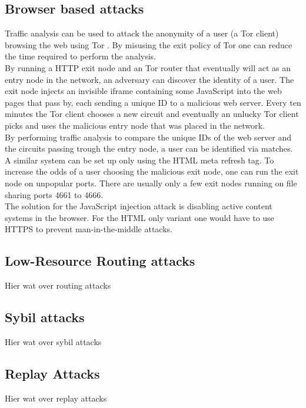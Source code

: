 \documentclass[journal]{IEEEtran}
\begin{document}
		\subsection{Browser based attacks}
		Traffic analysis can be used to attack the anonymity of a user (a Tor client) browsing the web using Tor \cite{abbott2007browser}. By misusing the exit policy of Tor one can reduce the time required to perform the analysis.\\

		By running a HTTP exit node and an Tor router that eventually will act as an entry node in the network, an adversary can discover the identity of a user. The exit node injects an invisible iframe containing some JavaScript into the web pages that pass by, each sending a unique ID to a malicious web server. Every ten minutes the Tor client chooses a new circuit and eventually an unlucky Tor client picks and uses the malicious entry node that was placed in the network.\\

		By performing traffic analysis to compare the unique IDs of the web server and the circuits passing trough the entry node, a user can be identified via matches. A similar system can be set up only using the HTML meta refresh tag. To increase the odds of a user choosing the malicious exit node, one can run the exit node on unpopular ports. There are usually only a few exit nodes running on file sharing ports 4661 to 4666.\\

		The solution for the JavaScript injection attack is disabling active content systems in the browser. For the HTML only variant one would have to use HTTPS to prevent man-in-the-middle attacks.
		
		\subsection{Low-Resource Routing attacks}
		Hier wat over routing attacks		
		
		\subsection{Sybil attacks}
		Hier wat over sybil attacks
		
		\subsection{Replay Attacks}
		Hier wat over replay attacks
\end{document}
